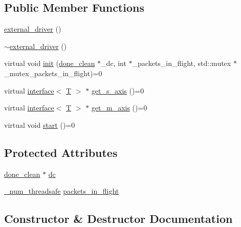\subsection*{Public Member Functions}
\begin{DoxyCompactItemize}
\item 
\hyperlink{classgalapagos_1_1external__driver_ae3ee965ba34df3e8c29f5c722d1ad51e}{external\+\_\+driver} ()
\item 
\hyperlink{classgalapagos_1_1external__driver_ab89f9aca8f2f88e3aef2eef0335022d7}{$\sim$external\+\_\+driver} ()
\item 
virtual void \hyperlink{classgalapagos_1_1external__driver_ab8b753325b02ee15efe16158cd3fe119}{init} (\hyperlink{classgalapagos_1_1done__clean}{done\+\_\+clean} $\ast$\+\_\+dc, int $\ast$\+\_\+packets\+\_\+in\+\_\+flight, std\+::mutex $\ast$\+\_\+mutex\+\_\+packets\+\_\+in\+\_\+flight)=0
\item 
virtual \hyperlink{classgalapagos_1_1interface}{interface}$<$ \hyperlink{test_8cpp_a0658ceffa730c765d449bb3d21871b5f}{T} $>$ $\ast$ \hyperlink{classgalapagos_1_1external__driver_aded446e9ebbdd03b461f336045aa7cd2}{get\+\_\+s\+\_\+axis} ()=0
\item 
virtual \hyperlink{classgalapagos_1_1interface}{interface}$<$ \hyperlink{test_8cpp_a0658ceffa730c765d449bb3d21871b5f}{T} $>$ $\ast$ \hyperlink{classgalapagos_1_1external__driver_abc7938fd7247c7404441473da71a357e}{get\+\_\+m\+\_\+axis} ()=0
\item 
virtual void \hyperlink{classgalapagos_1_1external__driver_a7eacf72788a4ce6976499e36f1b7b3a6}{start} ()=0
\end{DoxyCompactItemize}
\subsection*{Protected Attributes}
\begin{DoxyCompactItemize}
\item 
\hyperlink{classgalapagos_1_1done__clean}{done\+\_\+clean} $\ast$ \hyperlink{classgalapagos_1_1external__driver_aa868bceef97438040dbb3d795e96cd9e}{dc}
\item 
\hyperlink{structgalapagos_1_1__num__threadsafe}{\+\_\+num\+\_\+threadsafe} \hyperlink{classgalapagos_1_1external__driver_a66c3c0c6b022c1335beda3de4f18ced8}{packets\+\_\+in\+\_\+flight}
\end{DoxyCompactItemize}


\subsection{Constructor \& Destructor Documentation}

